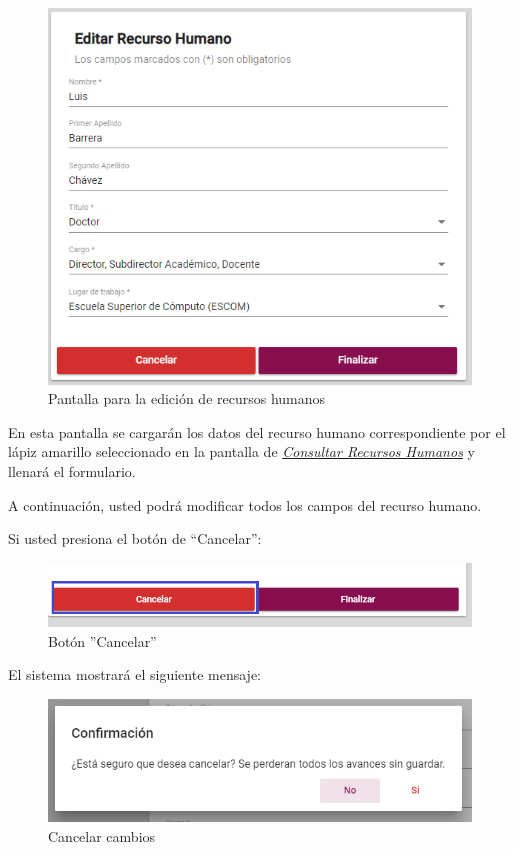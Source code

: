                 \begin{figure}[H]
                    \centering
                    \hypertarget{editarUs}{\includegraphics[width=0.6\linewidth]{images/SP1/EditarRH}}
                    \caption{Pantalla para la edición de recursos humanos}
                    \label{editarrh}
                \end{figure}

                En esta pantalla se cargarán los datos del recurso humano correspondiente por el lápiz amarillo seleccionado en la pantalla de \hyperlink{consultarRH}{\textit{Consultar Recursos Humanos}} y llenará el formulario.

                A continuación, usted podrá modificar todos los campos del recurso humano.

                Si usted presiona el botón de “Cancelar”:

                \begin{figure}[H]
                    \centering
                    \hypertarget{cancel2}{\includegraphics[width=0.7\linewidth]{images/SP1/BtnCancelar2}}
                    \caption{Botón ''Cancelar''}
                    \label{cancel2}
                \end{figure}

                El sistema mostrará el siguiente mensaje:
                  \clearpage
                 \begin{figure}[H]
                    \centering
                    \includegraphics[width=0.4\linewidth]{images/SP1/MSG29}
                    \caption{Cancelar cambios}
                    \label{mensaje29}

                \end{figure}

